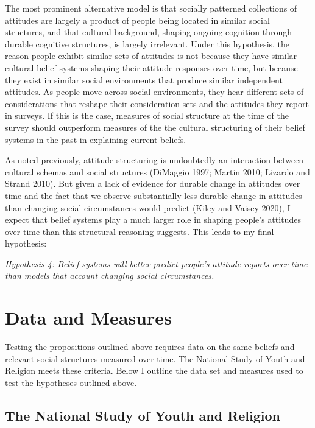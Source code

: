 \documentclass[12pt,]{article}
\begin{document}
The most prominent alternative model is that socially patterned collections of attitudes are largely a product of people being located in similar social structures, and that cultural background, shaping ongoing cognition through durable cognitive structures, is largely irrelevant. Under this hypothesis, the reason people exhibit similar sets of attitudes is not because they have similar cultural belief systems shaping their attitude responses over time, but because they exist in similar social environments that produce similar independent attitudes. As people move across social environments, they hear different sets of considerations that reshape their consideration sets and the attitudes they report in surveys. If this is the case, measures of social structure at the time of the survey should outperform measures of the the cultural structuring of their belief systems in the past in explaining current beliefs.

As noted previously, attitude structuring is undoubtedly an interaction between cultural schemas and social structures (DiMaggio 1997; Martin 2010; Lizardo and Strand 2010). But given a lack of evidence for durable change in attitudes over time and the fact that we observe substantially less durable change in attitudes than changing social circumstances would predict (Kiley and Vaisey 2020), I expect that belief systems play a much larger role in shaping people's attitudes over time than this structural reasoning suggests. This leads to my final hypothesis:

\emph{Hypothesis 4: Belief systems will better predict people's attitude reports over time than models that account changing social circumstances.}

\hypertarget{data-and-measures}{%
\section{Data and Measures}\label{data-and-measures}}

Testing the propositions outlined above requires data on the same beliefs and relevant social structures measured over time. The National Study of Youth and Religion meets these criteria. Below I outline the data set and measures used to test the hypotheses outlined above.

\hypertarget{the-national-study-of-youth-and-religion}{%
\subsection{The National Study of Youth and Religion}\label{the-national-study-of-youth-and-religion}}
\end{document}

